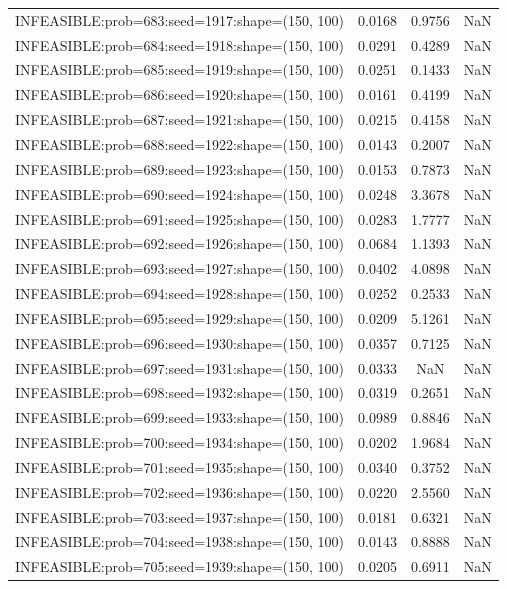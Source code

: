 \begin{longtable}{lccc}
INFEASIBLE:prob=683:seed=1917:shape=(150, 100) & 0.0168 &  0.9756 &    NaN \\
INFEASIBLE:prob=684:seed=1918:shape=(150, 100) & 0.0291 &  0.4289 &    NaN \\
INFEASIBLE:prob=685:seed=1919:shape=(150, 100) & 0.0251 &  0.1433 &    NaN \\
INFEASIBLE:prob=686:seed=1920:shape=(150, 100) & 0.0161 &  0.4199 &    NaN \\
INFEASIBLE:prob=687:seed=1921:shape=(150, 100) & 0.0215 &  0.4158 &    NaN \\
INFEASIBLE:prob=688:seed=1922:shape=(150, 100) & 0.0143 &  0.2007 &    NaN \\
INFEASIBLE:prob=689:seed=1923:shape=(150, 100) & 0.0153 &  0.7873 &    NaN \\
INFEASIBLE:prob=690:seed=1924:shape=(150, 100) & 0.0248 &  3.3678 &    NaN \\
INFEASIBLE:prob=691:seed=1925:shape=(150, 100) & 0.0283 &  1.7777 &    NaN \\
INFEASIBLE:prob=692:seed=1926:shape=(150, 100) & 0.0684 &  1.1393 &    NaN \\
INFEASIBLE:prob=693:seed=1927:shape=(150, 100) & 0.0402 &  4.0898 &    NaN \\
INFEASIBLE:prob=694:seed=1928:shape=(150, 100) & 0.0252 &  0.2533 &    NaN \\
INFEASIBLE:prob=695:seed=1929:shape=(150, 100) & 0.0209 &  5.1261 &    NaN \\
INFEASIBLE:prob=696:seed=1930:shape=(150, 100) & 0.0357 &  0.7125 &    NaN \\
INFEASIBLE:prob=697:seed=1931:shape=(150, 100) & 0.0333 &     NaN &    NaN \\
INFEASIBLE:prob=698:seed=1932:shape=(150, 100) & 0.0319 &  0.2651 &    NaN \\
INFEASIBLE:prob=699:seed=1933:shape=(150, 100) & 0.0989 &  0.8846 &    NaN \\
INFEASIBLE:prob=700:seed=1934:shape=(150, 100) & 0.0202 &  1.9684 &    NaN \\
INFEASIBLE:prob=701:seed=1935:shape=(150, 100) & 0.0340 &  0.3752 &    NaN \\
INFEASIBLE:prob=702:seed=1936:shape=(150, 100) & 0.0220 &  2.5560 &    NaN \\
INFEASIBLE:prob=703:seed=1937:shape=(150, 100) & 0.0181 &  0.6321 &    NaN \\
INFEASIBLE:prob=704:seed=1938:shape=(150, 100) & 0.0143 &  0.8888 &    NaN \\
INFEASIBLE:prob=705:seed=1939:shape=(150, 100) & 0.0205 &  0.6911 &    NaN \\

\end{longtable}
